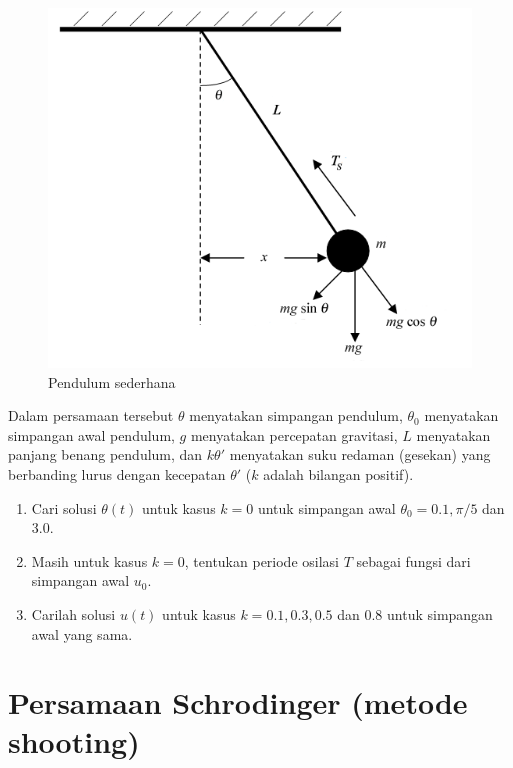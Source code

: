 \documentclass[12pt,bahasa]{article}
\begin{document}
\begin{figure}[H]
\centering
\includegraphics[scale=0.4]{images/pendulum.png}
\par
\caption{Pendulum sederhana}
\end{figure}

Dalam persamaan tersebut $\theta$ menyatakan simpangan pendulum,
$\theta_0$ menyatakan simpangan awal pendulum,
$g$ menyatakan percepatan gravitasi, $L$ menyatakan panjang benang pendulum,
dan $k\theta'$ menyatakan suku redaman (gesekan) yang berbanding lurus
dengan kecepatan $\theta'$ ($k$ adalah bilangan positif).

\begin{enumerate}[label=(\alph*)]
\item Cari solusi $\theta(t)$ untuk kasus $k=0$ untuk simpangan awal $\theta_0 = 0.1, \pi/5$
dan 3.0.
\item Masih untuk kasus $k=0$, tentukan periode osilasi $T$ sebagai
fungsi dari simpangan awal $u_0$.
\item Carilah solusi $u(t)$ untuk kasus $k = 0.1, 0.3, 0.5$ dan 0.8 untuk
simpangan awal yang sama.
\end{enumerate}


\section{Persamaan Schrodinger (metode shooting)}
\end{document}
